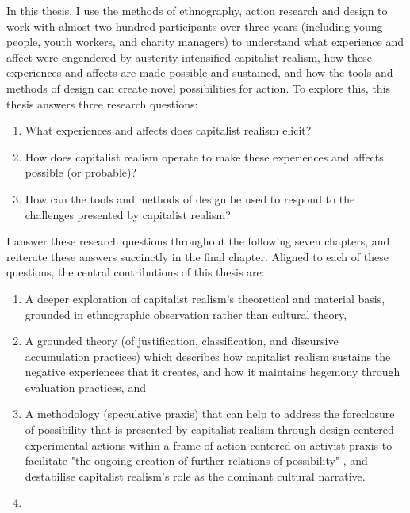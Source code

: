 In this thesis, I use the methods of ethnography, action research and design to work with almost two hundred participants over three years (including young people, youth workers, and charity managers) to understand what experience and affect were engendered by austerity-intensified capitalist realism, how these experiences and affects are made possible and sustained, and how the tools and methods of design can create novel possibilities for action. To explore this, this thesis answers three research questions: 
\begin{enumerate}
    \item What experiences and affects does capitalist realism elicit?
    \item How does capitalist realism operate to make these experiences and affects possible (or probable)?
    \item How can the tools and methods of design be used to respond to the challenges presented by capitalist realism?
\end{enumerate}
I answer these research questions throughout the following seven chapters, and reiterate these answers succinctly in the final chapter. Aligned to each of these questions, the central contributions of this thesis are:
\begin{enumerate}
    \item A deeper exploration of capitalist realism's theoretical and material basis, grounded in ethnographic observation rather than cultural theory,
    \item A grounded theory (of justification, classification, and discursive accumulation practices) which describes how capitalist realism sustains the negative experiences that it creates, and how it maintains hegemony through evaluation practices, and
    \item A methodology (speculative praxis) that can help to address the foreclosure of possibility that is presented by capitalist realism through design-centered experimental actions within a frame of action centered on activist praxis to facilitate "the ongoing creation of further relations of possibility" \citep{harrison_future_2020}, and destabilise capitalist realism's role as the dominant cultural narrative. 
    \item \end{enumerate}

